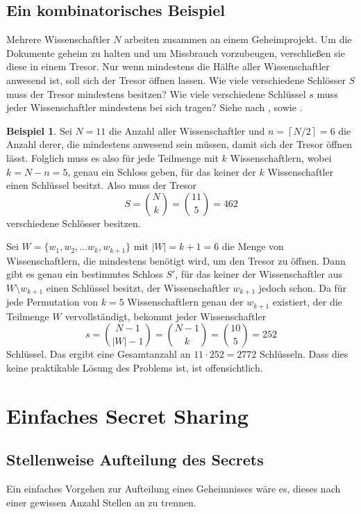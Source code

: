 \documentclass[12pt, a4paper, oneside, titlepage]{report}
\theoremstyle{definition}
\newtheorem{bsp}[lemma]{Beispiel}
\begin{document}
	\subsection{Ein kombinatorisches Beispiel}
	
	Mehrere Wissenschaftler $ N $ arbeiten zusammen an einem Geheimprojekt. Um die Dokumente geheim zu halten und um Missbrauch vorzubeugen, verschließen sie diese in einem Tresor. Nur wenn mindestens die Hälfte aller Wissenschaftler anwesend ist, soll sich der Tresor öffnen lassen. Wie viele verschiedene Schlösser $ S $ muss der Tresor mindestens besitzen? Wie viele verschiedene Schlüssel $ s $ muss jeder Wissenschaftler mindestens bei sich tragen? Siehe \cite{shamir} nach \cite{liu}, sowie \cite{quantum}.
	
	\begin{bsp}
		Sei $ N = 11 $ die Anzahl aller Wissenschaftler und $ n = \left\lceil N / 2 \right\rceil = 6 $ die Anzahl derer, die mindestens anwesend sein müssen, damit sich der Tresor öffnen lässt. Folglich muss es also für jede Teilmenge mit $ k $ Wissenschaftlern, wobei $ k = N - n = 5 $, genau ein Schloss geben, für das keiner der $ k $ Wissenschaftler einen Schlüssel besitzt. Also muss der Tresor $$ S = \binom{N}{k} = \binom{11}{5} = 462 $$ verschiedene Schlösser besitzen.
		
		Sei $ W = \{w_1, w_2, \dots w_k, w_{k+1}\} $ mit $ |W| = k + 1 = 6 $ die Menge von Wissenschaftlern, die mindestens benötigt wird, um den Tresor zu öffnen. Dann gibt es genau ein bestimmtes Schloss $ S' $, für das keiner der Wissenschaftler aus $ W \setminus w_{k+1} $ einen Schlüssel besitzt, der Wissenschaftler $ w_{k+1} $ jedoch schon. Da für jede Permutation von $ k = 5 $ Wissenschaftlern genau der $ w_{k+1} $ existiert, der die Teilmenge $ W $ \glqq vervollständigt\grqq, bekommt jeder Wissenschaftler $$ s = \binom{N-1}{|W|-1} = \binom{N-1}{k} = \binom{10}{5} = 252 $$ Schlüssel. Das ergibt eine Gesamtanzahl an $ 11 \cdot 252 = 2772 $ Schlüsseln. Dass dies keine praktikable Lösung des Problems ist, ist offensichtlich.
	\end{bsp}
	\section{Einfaches Secret Sharing}
	\subsection{Stellenweise Aufteilung des Secrets}
		Ein einfaches Vorgehen zur Aufteilung eines Geheimnisses wäre es, dieses nach einer gewissen Anzahl Stellen an zu trennen.
		
\end{document}
